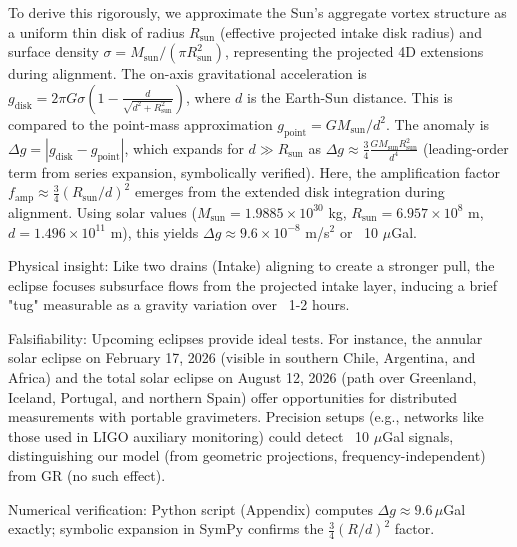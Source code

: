 To derive this rigorously, we approximate the Sun's aggregate vortex structure as a uniform thin disk of radius $R_\text{sun}$ (effective projected intake disk radius) and surface density $\sigma = M_\text{sun} / (\pi R_\text{sun}^2)$, representing the projected 4D extensions during alignment. The on-axis gravitational acceleration is $g_{\text{disk}} = 2 \pi G \sigma \left(1 - \frac{d}{\sqrt{d^2 + R_\text{sun}^2}}\right)$, where $d$ is the Earth-Sun distance. This is compared to the point-mass approximation $g_{\text{point}} = G M_\text{sun} / d^2$. The anomaly is $\Delta g = |g_{\text{disk}} - g_{\text{point}}|$, which expands for $d \gg R_\text{sun}$ as $\Delta g \approx \frac{3}{4} \frac{G M_\text{sun} R_\text{sun}^2}{d^4}$ (leading-order term from series expansion, symbolically verified). Here, the amplification factor $f_{\text{amp}} \approx \frac{3}{4} (R_\text{sun}/d)^2$ emerges from the extended disk integration during alignment. Using solar values ($M_\text{sun} = 1.9885 \times 10^{30}$ kg, $R_\text{sun} = 6.957 \times 10^8$ m, $d = 1.496 \times 10^{11}$ m), this yields $\Delta g \approx 9.6 \times 10^{-8}$ m/s$^2$ or ~10 $\mu$Gal.

Physical insight: Like two drains (Intake) aligning to create a stronger pull, the eclipse focuses subsurface flows from the projected intake layer, inducing a brief "tug" measurable as a gravity variation over ~1-2 hours.

Falsifiability: Upcoming eclipses provide ideal tests. For instance, the annular solar eclipse on February 17, 2026 (visible in southern Chile, Argentina, and Africa) and the total solar eclipse on August 12, 2026 (path over Greenland, Iceland, Portugal, and northern Spain) offer opportunities for distributed measurements with portable gravimeters. Precision setups (e.g., networks like those used in LIGO auxiliary monitoring) could detect ~10 $\mu$Gal signals, distinguishing our model (from geometric projections, frequency-independent) from GR (no such effect).

Numerical verification: Python script (Appendix) computes $\Delta g \approx 9.6 \, \mu$Gal exactly; symbolic expansion in SymPy confirms the $\frac{3}{4} (R/d)^2$ factor.

\medskip
\noindent
{}
\medskip



